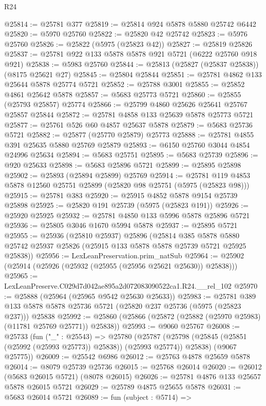 \begin{lexlean}{R24}
\begin{coremodule}
@25814 := @25781 @377
@25819 := @25814 @924 @5878 @5880 @25742 @6442
@25820 := @5970 @25760
@25822 := @25820 @42 @25742
@25823 := @5976 @25760
@25826 := @25822 (@5975 (@25823 @42))
@25827 := @25819 @25826
@25837 := @25781 @922 @133 @5878 @5878 @921 @5721 (@6222 @25760 @918 @921)
@25838 := @5983 @25760
@25844 := @25813 (@25827 (@25837 @25838)) (@8175 @25621 @27)
@25845 := @25804 @25844
@25851 := @25781 @4862 @133 @25644 @5878 @25774 @5721
@25852 := @25788 @3001
@25855 := @25852 @4861 @25642 @5878
@25857 := @5683 @25773 @5721
@25860 := @25855 (@25793 @25857) @25774
@25866 := @25799 @4860 @25626 @25641 @25767 @25857 @25844
@25872 := @25781 @4858 @133 @25639 @5878 @25773 @5721
@25877 := @25761 @526 @60 @4857 @25637 @5878
@25879 := @5683 @25736 @5721
@25882 := @25877 (@25770 @25879) @25773
@25888 := @25781 @4855 @391 @25635 @5880 @25769 @25879
@25893 := @6150 @25760 @3044 @4854 @24996 @25634
@25894 := @5683 @25751
@25895 := @5683 @25739
@25896 := @920 @25633
@25898 := @5683 @25896 @5721
@25899 := @25895 @25898
@25902 := @25893 (@25894 @25899) @25769
@25914 := @25781 @119 @4853 @5878 @12560 @25751 @25899 (@25820 @98 @25751 (@5975 (@25823 @98)))
@25915 := @25781 @383
@25920 := @25915 @4852 @5878 @9154 @25739 @25898
@25925 := @25820 @191 @25739 (@5975 (@25823 @191))
@25926 := @25920 @25925
@25932 := @25781 @4850 @133 @5996 @5878 @25896 @5721
@25936 := @25805 @3046 @1670 @5994 @5878
@25937 := @25895 @5721
@25955 := @25936
    (@25810 @25937)
    @25896
    (@25814
      @385
      @5878
      @5880
      @25742
      @25937
      @25826
      (@25915 @133 @5878 @5878 @25739 @5721 @25925 @25838))
@25956 := LexLeanPreservation.prim_natSub
@25964 := @25902 (@25914 (@25926 (@25932 (@25955 (@25956 @25621 @25630)) @25838)))
@25965 := LexLeanPreserve.C029d7d042ae895a2d072083090522ca1.R24.__rel_102
@25970 := @25888 (@25964 (@25965 @9542 @25630 @25633))
@25983 := @25781
    @389
    @133
    @5878
    @5878
    @25736
    @5721
    (@25820 @237 @25736 (@5975 (@25823 @237)))
    @25838
@25992 := @25860 (@25866 (@25872 (@25882 (@25970 @25983) (@11781 @25769 @25771)) @25838))
@25993 := @9060 @25767
@26008 := @25733
    (fun ("_" : @25543) =>
    @25780
      (@25787 (@25798 (@25845 (@25851 (@25992 (@25993 @25773)) @25838)) (@25993 @25774)) @25838)
      (@9067 @25775))
@26009 := @25542 @6986
@26012 := @25763 @4878 @25659 @5878
@26014 := @8079 @25739 @25736
@26015 := @25768 @26014
@26020 := @26012 (@5683 @26015 @5721) (@8078 @26015)
@26026 := @25781 @4876 @133 @25657 @5878 @26015 @5721
@26029 := @25789 @4875 @25655 @5878
@26031 := @5683 @26014 @5721
@26089 := fun (subject : @5714) =>

\end{coremodule}
\end{lexlean}
